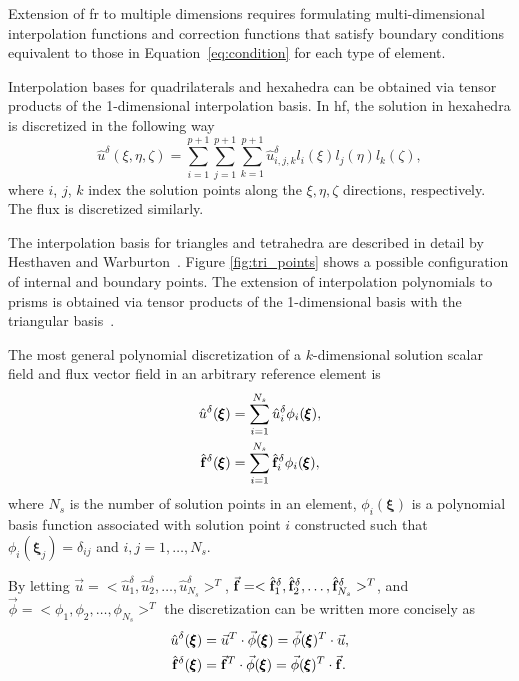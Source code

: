 Extension of \gls{fr} to multiple dimensions requires formulating multi-dimensional interpolation functions and correction functions that satisfy boundary conditions equivalent to those in Equation~\eqref{eq:condition} for each type of element.

Interpolation bases for quadrilaterals and hexahedra can be obtained via tensor products of the 1-dimensional interpolation basis. In \gls{hf}, the solution in hexahedra is discretized in the following way
\begin{equation}
{\hat{u}}^\delta(\xi,\eta,\zeta) = \sum_{i=1}^{p+1} \sum_{j=1}^{p+1} \sum_{k=1}^{p+1}
{\hat{u}}^\delta_{i,j,k} l_i(\xi) l_j(\eta) l_k(\zeta),
\end{equation}
where $i$, $j$, $k$ index the solution points along the $\xi, \eta, \zeta$ directions, respectively. The flux is discretized similarly.

The interpolation basis for triangles and tetrahedra are described in detail by Hesthaven and Warburton~\cite{hesthaven2007nodal}. Figure \ref{fig:tri_points} shows a possible configuration of internal and boundary points. The extension of interpolation polynomials to prisms is obtained via tensor products of the 1-dimensional basis with the triangular basis~\cite{castonguay2011}. 

The most general polynomial discretization of a $k$-dimensional solution scalar field and flux vector field in an arbitrary reference element is
\begin{align}
\label{eqn:general_u}
\hat{u}^\delta({\pmb \xi}) &= \sum_{i=1}^{N_s} \hat{u}_i^\delta {\phi}_i({\pmb \xi}),\\
\hat{\bf f}^\delta({\pmb \xi}) &= \sum_{i=1}^{N_s} \hat{\bf f}_i^\delta {\phi}_i({\pmb \xi}),
\end{align}
where $N_s$ is the number of solution points in an element, ${\phi}_i({\pmb \xi})$ is a polynomial basis function associated with solution point $i$ constructed such that ${\phi}_i({\pmb \xi}_j) = \delta_{ij}$ and $i,j = 1,\dots,N_s$.

By letting $\vec{u} = <\hat{u}_1^\delta, \hat{u}_2^\delta,\dots,\hat{u}_{N_s}^\delta>^T $, $\vec{\bf f} = <\hat{\bf f}_1^\delta, \hat{\bf f}_2^\delta,\dots,\hat{\bf f}_{N_s}^\delta>^T $, and $\vec{\phi} = <\phi_1,\phi_2,\dots,\phi_{N_s}>^T$ the discretization can be written more concisely as
\begin{equation}
\begin{split}
\hat{u}^\delta({\pmb \xi}) &= \vec{u}^T \cdot \vec{\phi}({\pmb \xi}) =  \vec{\phi}({\pmb \xi})^T\cdot \vec{u},\\
\hat{\bf f}^\delta({\pmb \xi}) &= \vec{\bf f}^T \cdot \vec{\phi}({\pmb \xi}) = \vec{\phi}({\pmb \xi})^T \cdot \vec{\bf f}.
\end{split}
\end{equation}

